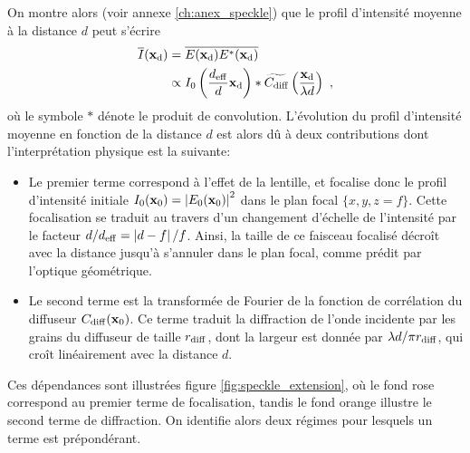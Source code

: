 On montre alors (voir annexe \ref{ch:anex_speckle}) que le profil d'intensité moyenne à la distance $d$ peut s'écrire
\begin{align}
\nonumber\overline{I}(\mathbf{x}_{\mathrm{d}})&=\overline{E(\mathbf{x}_{\mathrm{d}}) E^*(\mathbf{x}_{\mathrm{d}})} \\
&\propto I_0 \left( \frac{d_{\mathrm{eff}}}{d} \mathbf{x}_{\mathrm{d}} \right) \ast \widetilde{C_{\mathrm{diff}}}\left( \frac{\mathbf{x}_{\mathrm{d}}}{\lambda d} \right) \text{ ,}
\end{align}
où le symbole $\ast$ dénote le produit de convolution. L'évolution du profil d'intensité moyenne en fonction de la distance $d$ est alors dû à deux contributions dont l'interprétation physique est la suivante:
\begin{itemize}
\item[\textendash] Le premier terme correspond à l'effet de la lentille, et focalise donc le profil d'intensité initiale $I_0(\mathbf{x}_0)=\left| E_0(\mathbf{x}_0) \right|^2$ dans le plan focal $\lbrace x,y,z=f\rbrace$. Cette focalisation se traduit au travers d'un changement d'échelle de l'intensité par le facteur $d/d_{\mathrm{eff}}=\left| d-f \right| /f$. Ainsi, la taille de ce faisceau focalisé décroît avec la distance jusqu'à s'annuler dans le plan focal, comme prédit par l'optique géométrique.
\item[\textendash] Le second terme est la transformée de Fourier de la fonction de corrélation du diffuseur $C_{\mathrm{diff}}(\mathbf{x}_0)$. Ce terme traduit la diffraction de l'onde incidente par les grains du diffuseur de taille $r_{\mathrm{diff}}$, dont la largeur est donnée par $\lambda d/ \pi r_{\mathrm{diff}}$, qui croît linéairement avec la distance $d$.
\end{itemize}
Ces dépendances sont illustrées figure \ref{fig:speckle_extension}, où le fond rose correspond au premier terme de focalisation, tandis le fond orange illustre le second terme de diffraction. On identifie alors deux régimes pour lesquels un terme est prépondérant. 

